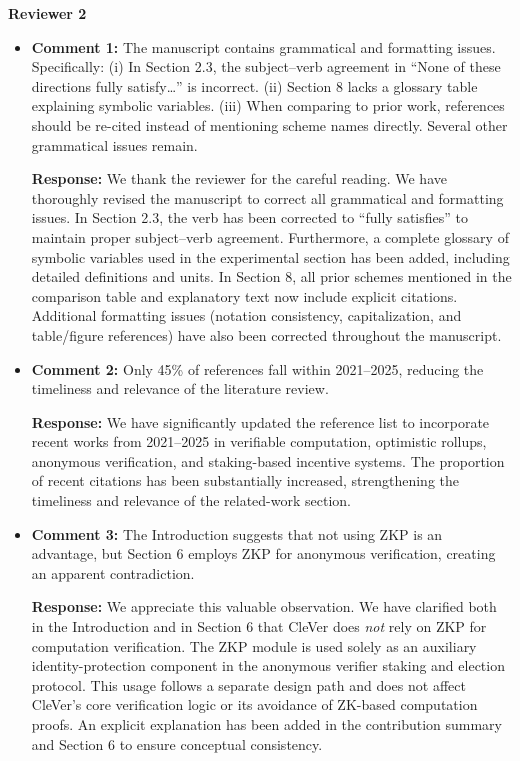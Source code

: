 \documentclass[3p]{elsarticle}
\theoremstyle{remark}
\begin{document}
\textbf{Reviewer 2}
\begin{itemize}

    \item \textbf{Comment 1:} 
    The manuscript contains grammatical and formatting issues. Specifically:
    (i) In Section 2.3, the subject–verb agreement in “None of these directions fully satisfy…” is incorrect.  
    (ii) Section 8 lacks a glossary table explaining symbolic variables.  
    (iii) When comparing to prior work, references should be re-cited instead of mentioning scheme names directly.  
    Several other grammatical issues remain.

    \textbf{Response:} 
    We thank the reviewer for the careful reading.  
    We have thoroughly revised the manuscript to correct all grammatical and formatting issues.  
    In Section 2.3, the verb has been corrected to “fully satisfies” to maintain proper subject–verb agreement.  
    Furthermore, a complete glossary of symbolic variables used in the experimental section has been added, including detailed definitions and units.  
    In Section 8, all prior schemes mentioned in the comparison table and explanatory text now include explicit citations.  
    Additional formatting issues (notation consistency, capitalization, and table/figure references) have also been corrected throughout the manuscript.
    
    \item \textbf{Comment 2:} 
    Only 45\% of references fall within 2021–2025, reducing the timeliness and relevance of the literature review.

    \textbf{Response:} 
    We have significantly updated the reference list to incorporate recent works from 2021–2025 in verifiable computation, optimistic rollups, anonymous verification, and staking-based incentive systems.  
    The proportion of recent citations has been substantially increased, strengthening the timeliness and relevance of the related-work section.

    \item \textbf{Comment 3:} 
    The Introduction suggests that not using ZKP is an advantage, but Section 6 employs ZKP for anonymous verification, creating an apparent contradiction.

    \textbf{Response:}
    We appreciate this valuable observation.  
    We have clarified both in the Introduction and in Section 6 that CleVer does \emph{not} rely on ZKP for computation verification.  
    The ZKP module is used solely as an auxiliary identity-protection component in the anonymous verifier staking and election protocol.  
    This usage follows a separate design path and does not affect CleVer’s core verification logic or its avoidance of ZK-based computation proofs.  
    An explicit explanation has been added in the contribution summary and Section 6 to ensure conceptual consistency.


\end{itemize}
\end{document}
